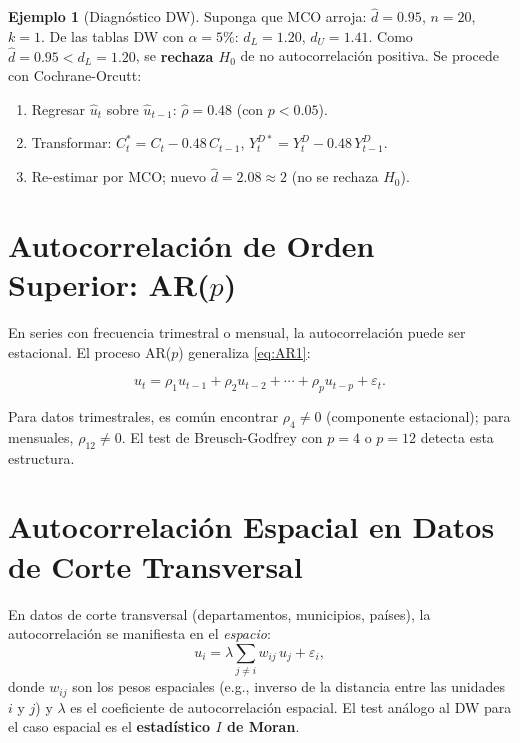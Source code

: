 \documentclass[12pt,a4paper]{article}
\theoremstyle{definition}
\newtheorem{ejemplo}{Ejemplo}[section]
\theoremstyle{remark}
\begin{document}
\begin{ejemplo}[Diagnóstico DW]
  Suponga que MCO arroja: $\hat d = 0.95$, $n = 20$, $k = 1$.
  De las tablas DW con $\alpha = 5\%$: $d_L = 1.20$, $d_U = 1.41$.
  Como $\hat d = 0.95 < d_L = 1.20$, se \textbf{rechaza $H_0$} de no
  autocorrelación positiva. Se procede con Cochrane-Orcutt:
  \begin{enumerate}[label=\textbf{\arabic*.}, itemsep=3pt]
    \item Regresar $\hat u_t$ sobre $\hat u_{t-1}$:
          $\hat\rho = 0.48$ (con $p < 0.05$).
    \item Transformar: $C_t^* = C_t - 0.48\,C_{t-1}$,
          $Y_t^{D*} = Y_t^D - 0.48\,Y_{t-1}^D$.
    \item Re-estimar por MCO; nuevo $\hat d = 2.08 \approx 2$
          (no se rechaza $H_0$).
  \end{enumerate}
\end{ejemplo}

\section{Autocorrelación de Orden Superior: AR($p$)}
\label{sec:orden-superior}

En series con frecuencia trimestral o mensual, la autocorrelación puede
ser estacional. El proceso AR($p$) generaliza \eqref{eq:AR1}:

\begin{equation}
  u_t = \rho_1 u_{t-1} + \rho_2 u_{t-2} + \cdots + \rho_p u_{t-p}
        + \varepsilon_t.
  \label{eq:ARp}
\end{equation}

Para datos trimestrales, es común encontrar $\rho_4 \neq 0$
(componente estacional); para mensuales, $\rho_{12} \neq 0$.
El test de Breusch-Godfrey con $p = 4$ o $p = 12$ detecta
esta estructura.

\section{Autocorrelación Espacial en Datos de Corte Transversal}
\label{sec:espacial}

En datos de corte transversal (departamentos, municipios, países),
la autocorrelación se manifiesta en el \emph{espacio}:
\begin{equation}
  u_i = \lambda \sum_{j \neq i} w_{ij}\,u_j + \varepsilon_i,
  \label{eq:autocorr-espacial}
\end{equation}
donde $w_{ij}$ son los pesos espaciales (e.g., inverso de la distancia
entre las unidades $i$ y $j$) y $\lambda$ es el coeficiente de
autocorrelación espacial. El test análogo al DW para el caso espacial
es el \textbf{estadístico $I$ de Moran}.
\end{document}
